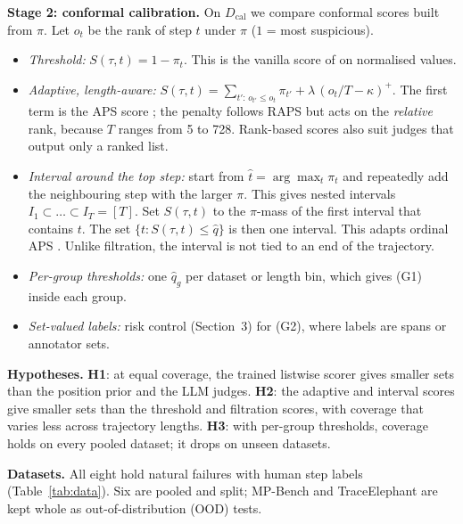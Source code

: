\documentclass[10pt,a4paper]{article}
\makeatletter
\renewcommand\section{\@startsection{section}{1}{\z@}{6pt plus 2pt minus 1pt}{2pt}{\normalsize\bfseries}}
\newcommand{\traj}{\tau}
\newcommand{\qhat}{\hat q}
\newcommand{\Dcal}{D_{\mathrm{cal}}}
\makeatother
\begin{document}
\textbf{Stage 2: conformal calibration.} On $\Dcal$ we compare conformal scores built from $\pi$. Let $o_t$ be the rank of step $t$ under $\pi$ ($1$ = most suspicious).
\begin{itemize}
\item \emph{Threshold:} $S(\traj,t)=1-\pi_t$. This is the vanilla score of \cite{feng2026conformal} on normalised values.
\item \emph{Adaptive, length-aware:} $S(\traj,t)=\sum_{t':\,o_{t'}\le o_t}\pi_{t'}+\lambda\,(o_t/T-\kappa)^{+}$. The first term is the APS score \cite{romano2020aps}; the penalty follows RAPS \cite{angelopoulos2021raps} but acts on the \emph{relative} rank, because $T$ ranges from 5 to 728. Rank-based scores \cite{huang2024saps} also suit judges that output only a ranked list.
\item \emph{Interval around the top step:} start from $\hat t=\arg\max_t\pi_t$ and repeatedly add the neighbouring step with the larger $\pi$. This gives nested intervals $I_1\subset\dots\subset I_T=[T]$. Set $S(\traj,t)$ to the $\pi$-mass of the first interval that contains $t$. The set $\{t:S(\traj,t)\le\qhat\}$ is then one interval. This adapts ordinal APS \cite{lu2022ordinal}. Unlike filtration, the interval is not tied to an end of the trajectory.
\item \emph{Per-group thresholds:} one $\qhat_g$ per dataset or length bin, which gives (G1) inside each group.
\item \emph{Set-valued labels:} risk control (Section~3) for (G2), where labels are spans or annotator sets.
\end{itemize}

\textbf{Hypotheses.} \textbf{H1}: at equal coverage, the trained listwise scorer gives smaller sets than the position prior and the LLM judges. \textbf{H2}: the adaptive and interval scores give smaller sets than the threshold and filtration scores, with coverage that varies less across trajectory lengths. \textbf{H3}: with per-group thresholds, coverage holds on every pooled dataset; it drops on unseen datasets.

\section{Evaluation Plan}

\textbf{Datasets.} All eight hold natural failures with human step labels (Table~\ref{tab:data}). Six are pooled and split; MP-Bench and TraceElephant are kept whole as out-of-distribution (OOD) tests.
\end{document}

